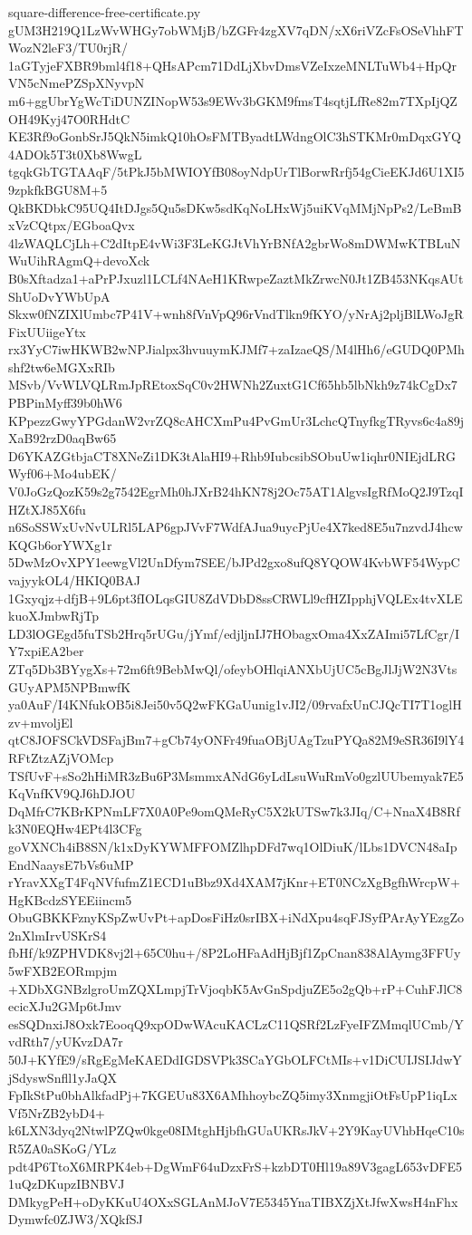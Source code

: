 \documentclass[11pt]{article}
\theoremstyle{definition}
\theoremstyle{remark}
\begin{document}
\begin{filecontents*}[overwrite]{square-difference-free-certificate.py}
gUM3H219Q1LzWvWHGy7obWMjB/bZGFr4zgXV7qDN/xX6riVZcFsOSeVhhFTWozN2leF3/TU0rjR/
1aGTyjeFXBR9bml4f18+QHsAPcm71DdLjXbvDmsVZeIxzeMNLTuWb4+HpQrVN5cNmePZSpXNyvpN
m6+ggUbrYgWcTiDUNZINopW53s9EWv3bGKM9fmsT4sqtjLfRe82m7TXpIjQZOH49Kyj47O0RHdtC
KE3Rf9oGonbSrJ5QkN5imkQ10hOsFMTByadtLWdngOlC3hSTKMr0mDqxGYQ4ADOk5T3t0Xb8WwgL
tgqkGbTGTAAqF/5tPkJ5bMWIOYfB08oyNdpUrTlBorwRrfj54gCieEKJd6U1XI59zpkfkBGU8M+5
QkBKDbkC95UQ4ItDJgs5Qu5sDKw5sdKqNoLHxWj5uiKVqMMjNpPs2/LeBmBxVzCQtpx/EGboaQvx
4lzWAQLCjLh+C2dItpE4vWi3F3LeKGJtVhYrBNfA2gbrWo8mDWMwKTBLuNWuUihRAgmQ+devoXck
B0sXftadza1+aPrPJxuzl1LCLf4NAeH1KRwpeZaztMkZrwcN0Jt1ZB453NKqsAUtShUoDvYWbUpA
Skxw0fNZIXlUmbc7P41V+wnh8fVnVpQ96rVndTlkn9fKYO/yNrAj2pljBlLWoJgRFixUUiigeYtx
rx3YyC7iwHKWB2wNPJialpx3hvuuymKJMf7+zaIzaeQS/M4lHh6/eGUDQ0PMhshf2tw6eMGXxRIb
MSvb/VvWLVQLRmJpREtoxSqC0v2HWNh2ZuxtG1Cf65hb5lbNkh9z74kCgDx7PBPinMyff39b0hW6
KPpezzGwyYPGdanW2vrZQ8cAHCXmPu4PvGmUr3LchcQTnyfkgTRyvs6c4a89jXaB92rzD0aqBw65
D6YKAZGtbjaCT8XNeZi1DK3tAlaHI9+Rhb9IubcsibSObuUw1iqhr0NIEjdLRGWyf06+Mo4ubEK/
V0JoGzQozK59s2g7542EgrMh0hJXrB24hKN78j2Oc75AT1AlgvsIgRfMoQ2J9TzqIHZtXJ85X6fu
n6SoSSWxUvNvULRl5LAP6gpJVvF7WdfAJua9uycPjUe4X7ked8E5u7nzvdJ4hcwKQGb6orYWXg1r
5DwMzOvXPY1eewgVl2UnDfym7SEE/bJPd2gxo8ufQ8YQOW4KvbWF54WypCvajyykOL4/HKIQ0BAJ
1Gxyqjz+dfjB+9L6pt3fIOLqsGIU8ZdVDbD8ssCRWLl9cfHZIpphjVQLEx4tvXLEkuoXJmbwRjTp
LD3lOGEgd5fuTSb2Hrq5rUGu/jYmf/edjljnIJ7HObagxOma4XxZAImi57LfCgr/IY7xpiEA2ber
ZTq5Db3BYygXs+72m6ft9BebMwQl/ofeybOHlqiANXbUjUC5cBgJlJjW2N3VtsGUyAPM5NPBmwfK
ya0AuF/I4KNfukOB5i8Jei50v5Q2wFKGaUunig1vJI2/09rvafxUnCJQcTI7T1oglHzv+mvoljEl
qtC8JOFSCkVDSFajBm7+gCb74yONFr49fuaOBjUAgTzuPYQa82M9eSR36I9lY4RFtZtzAZjVOMcp
TSfUvF+sSo2hHiMR3zBu6P3MsmmxANdG6yLdLsuWuRmVo0gzlUUbemyak7E5KqVnfKV9QJ6hDJOU
DqMfrC7KBrKPNmLF7X0A0Pe9omQMeRyC5X2kUTSw7k3JIq/C+NnaX4B8Rfk3N0EQHw4EPt4l3CFg
goVXNCh4iB8SN/k1xDyKYWMFFOMZlhpDFd7wq1OlDiuK/lLbs1DVCN48aIpEndNaaysE7bVs6uMP
rYravXXgT4FqNVfufmZ1ECD1uBbz9Xd4XAM7jKnr+ET0NCzXgBgfhWrcpW+HgKBcdzSYEEiincm5
ObuGBKKFznyKSpZwUvPt+apDosFiHz0srIBX+iNdXpu4sqFJSyfPArAyYEzgZo2nXlmIrvUSKrS4
fbHf/k9ZPHVDK8vj2l+65C0hu+/8P2LoHFaAdHjBjf1ZpCnan838AlAymg3FFUy5wFXB2EORmpjm
+XDbXGNBzlgroUmZQXLmpjTrVjoqbK5AvGnSpdjuZE5o2gQb+rP+CuhFJlC8ecicXJu2GMp6tJmv
esSQDnxiJ8Oxk7EooqQ9xpODwWAcuKACLzC11QSRf2LzFyeIFZMmqlUCmb/YvdRth7/yUKvzDA7r
50J+KYfE9/sRgEgMeKAEDdIGDSVPk3SCaYGbOLFCtMIs+v1DiCUIJSIJdwYjSdyswSnfll1yJaQX
FpIkStPu0bhAlkfadPj+7KGEUu83X6AMhhoybcZQ5imy3XnmgjiOtFsUpP1iqLxVf5NrZB2ybD4+
k6LXN3dyq2NtwlPZQw0kge08IMtghHjbfhGUaUKRsJkV+2Y9KayUVhbHqeC10sR5ZA0aSKoG/YLz
pdt4P6TtoX6MRPK4eb+DgWmF64uDzxFrS+kzbDT0Hl19a89V3gagL653vDFE51uQzDKupzIBNBVJ
DMkygPeH+oDyKKuU4OXxSGLAnMJoV7E5345YnaTIBXZjXtJfwXwsH4nFhxDymwfc0ZJW3/XQkfSJ

\end{filecontents*}
\end{document}
